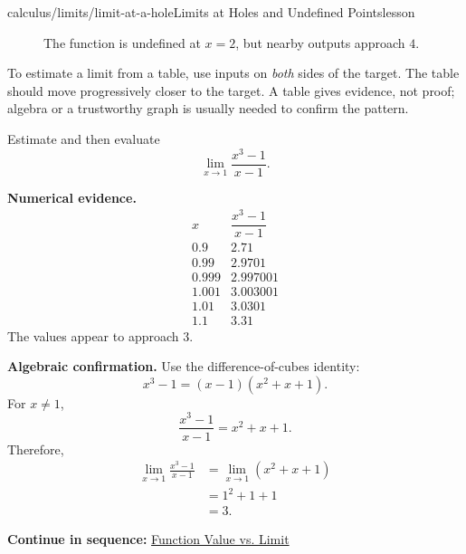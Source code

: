 \documentclass[11pt,openany]{book}
\theoremstyle{bgplain}
\newcounter{bgexample}[chapter]
\newcommand{\webnext}[2]{%
  \par\addvspace{1.2em}\noindent{\color{BGLine}\rule{\textwidth}{0.35pt}}\par\smallskip
  {\small\color{BGGray}\textbf{Continue in sequence:} \hyperlink{web:#1}{#2}}\par
}
\begin{document}
\begin{webpage}{calculus/limits/limit-at-a-hole}{Limits at Holes and Undefined Points}{lesson}
\begin{figure}[htbp]
\centering
{}
\caption{The function is undefined at \(x=2\), but nearby outputs approach \(4\).}
\label{fig:hole}
\end{figure}

\begin{bgmethod}
To estimate a limit from a table, use inputs on \emph{both} sides of the target. The table should move progressively closer to the target. A table gives evidence, not proof; algebra or a trustworthy graph is usually needed to confirm the pattern.
\end{bgmethod}

\begin{bgexample}[title={Table, graph, and algebra agree}]
Estimate and then evaluate
\[
  \lim_{x\to1}\frac{x^3-1}{x-1}.
\]

\begin{bgsolution}
\textbf{Numerical evidence.}
\[
\begin{array}{c|c}
 x & \dfrac{x^3-1}{x-1}\\
\hline
0.9&2.71\\
0.99&2.9701\\
0.999&2.997001\\
1.001&3.003001\\
1.01&3.0301\\
1.1&3.31
\end{array}
\]
The values appear to approach \(3\).

\textbf{Algebraic confirmation.} Use the difference-of-cubes identity:
\[
  x^3-1=(x-1)(x^2+x+1).
\]
For \(x\ne1\),
\[
  \frac{x^3-1}{x-1}=x^2+x+1.
\]
Therefore,
\[
\begin{aligned}
\lim_{x\to1}\frac{x^3-1}{x-1}
&=\lim_{x\to1}(x^2+x+1)\\
&=1^2+1+1\\
&=\boxed{3}.
\end{aligned}
\]
\end{bgsolution}
\end{bgexample}
\webnext{calculus/limits/function-value-vs-limit}{Function Value vs. Limit}
\end{webpage}
\end{document}
